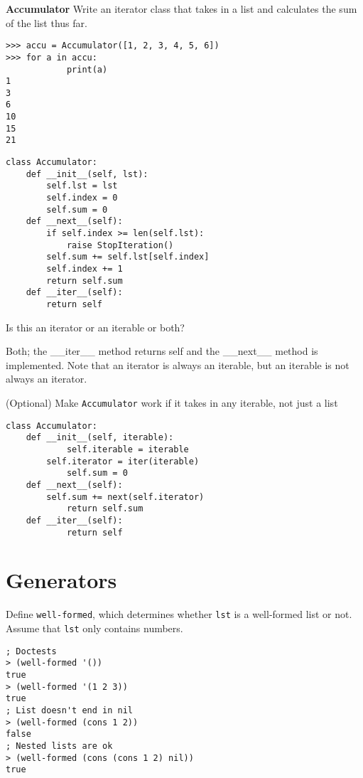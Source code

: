 \documentclass{exam}
\begin{document}
\begin{questions}
\begin{blocksection}
\question \textbf{Accumulator} Write an iterator class that takes in a list and calculates the sum of the list thus far.
\begin{lstlisting}
>>> accu = Accumulator([1, 2, 3, 4, 5, 6])
>>> for a in accu:
            print(a)
1
3
6
10
15
21
\end{lstlisting}
\end{blocksection}

\begin{solution}
\begin{lstlisting}
class Accumulator:
	def __init__(self, lst):
		self.lst = lst
		self.index = 0
		self.sum = 0
	def __next__(self):
		if self.index >= len(self.lst):
			raise StopIteration()
		self.sum += self.lst[self.index]
		self.index += 1
		return self.sum
	def __iter__(self):
		return self
\end{lstlisting}
\end{solution}

\question Is this an iterator or an iterable or both?
\begin{solution}
Both; the __iter__ method returns self and the __next__ method is implemented. Note that an iterator is always an iterable, but an iterable is not always an iterator.
\end{solution}

\question (Optional) Make \texttt{Accumulator} work if it takes in any iterable, not just a list

\begin{solution}
\begin{lstlisting}
class Accumulator:
	def __init__(self, iterable):
    		self.iterable = iterable
		self.iterator = iter(iterable)
            self.sum = 0
	def __next__(self):
    	self.sum += next(self.iterator)
    		return self.sum
	def __iter__(self):
    		return self
\end{lstlisting}
\end{solution}

\section{Generators}

\begin{blocksection}
\question Define \texttt{well-formed}, which determines whether \texttt{lst} is a well-formed list or not. Assume that \texttt{lst} only contains numbers.

\begin{lstlisting}
; Doctests
> (well-formed '())
true
> (well-formed '(1 2 3))
true
; List doesn't end in nil
> (well-formed (cons 1 2))
false
; Nested lists are ok
> (well-formed (cons (cons 1 2) nil))
true
\end{lstlisting}


\end{blocksection}
\end{questions}
\end{document}
